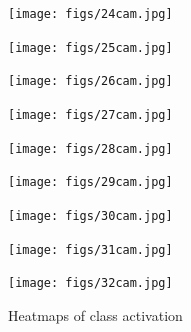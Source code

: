 \begin{figure}[H]

  \begin{minipage}[t]{.3\linewidth}
    \centering
    \texttt{[image: figs/24cam.jpg]}
    
  \end{minipage}
  \hfill
\begin{minipage}[t]{.3\linewidth}
    \centering
    \texttt{[image: figs/25cam.jpg]}
    
  \end{minipage}
  \hfill
  \begin{minipage}[t]{.3\linewidth}
    \centering
    \texttt{[image: figs/26cam.jpg]}
    
  \end{minipage}
  \hfill
  \begin{minipage}[t]{.3\linewidth}
    \centering
    \texttt{[image: figs/27cam.jpg]}
    
  \end{minipage}
  \hfill
  \begin{minipage}[t]{.3\linewidth}
    \centering
    \texttt{[image: figs/28cam.jpg]}
    
  \end{minipage}
  \hfill
\begin{minipage}[t]{.3\linewidth}
    \centering
    \texttt{[image: figs/29cam.jpg]}
   
  \end{minipage}
  \hfill
\begin{minipage}[t]{.3\linewidth}
    \centering
    \texttt{[image: figs/30cam.jpg]}
    
  \end{minipage}
  \hfill
\begin{minipage}[t]{.3\linewidth}
    \centering
    \texttt{[image: figs/31cam.jpg]}
    
  \end{minipage}
  \hfill
  \begin{minipage}[t]{.3\linewidth}
    \centering
    \texttt{[image: figs/32cam.jpg]}
    
  \end{minipage}
  \hfill

  \caption{Heatmaps of class activation}
  \vspace{-3mm}
  
\end{figure}
